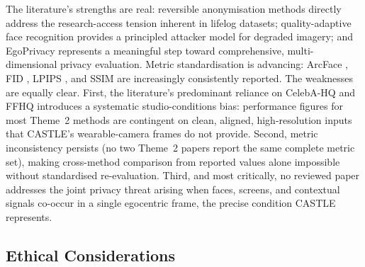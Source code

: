 \documentclass[12pt, onecolumn]{IEEEtran}
\begin{document}
The literature's strengths are real: reversible anonymisation methods
\cite{muhammad2026refacex, zhang2025keydriven} directly address the
research-access tension inherent in lifelog datasets; quality-adaptive
face recognition \cite{kim2022adaface} provides a principled attacker
model for degraded imagery; and EgoPrivacy \cite{li2025egoprivacy}
represents a meaningful step toward comprehensive, multi-dimensional
privacy evaluation. Metric standardisation is advancing: ArcFace
\cite{deng2019arcface}, FID \cite{heusel2017fid}, LPIPS
\cite{zhang2018lpips}, and SSIM \cite{wang2004ssim} are increasingly
consistently reported. The weaknesses are equally clear. First, the
literature's predominant reliance on CelebA-HQ and FFHQ introduces a
systematic studio-conditions bias: performance figures for most Theme~2
methods are contingent on clean, aligned, high-resolution inputs that
CASTLE's wearable-camera frames do not provide. Second, metric
inconsistency persists (no two Theme~2 papers report the same complete
metric set), making cross-method comparison from reported values alone
impossible without standardised re-evaluation. Third, and most
critically, no reviewed paper addresses the joint privacy threat arising
when faces, screens, and contextual signals co-occur in a single
egocentric frame, the precise condition CASTLE represents.

\subsection{Ethical Considerations}
\end{document}
